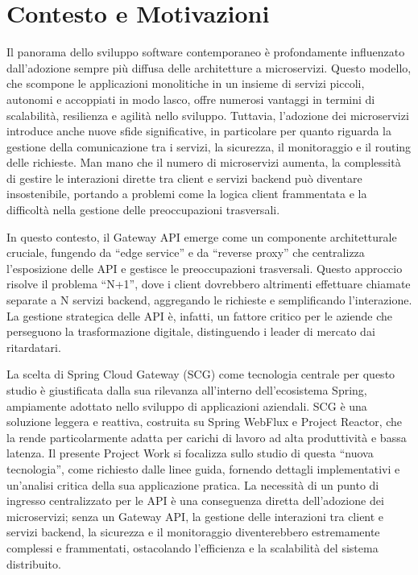 \section{Contesto e Motivazioni}

Il panorama dello sviluppo software contemporaneo è profondamente influenzato dall'adozione sempre più diffusa delle architetture a microservizi. Questo modello, che scompone le applicazioni monolitiche in un insieme di servizi piccoli, autonomi e accoppiati in modo lasco, offre numerosi vantaggi in termini di scalabilità, resilienza e agilità nello sviluppo. Tuttavia, l'adozione dei microservizi introduce anche nuove sfide significative, in particolare per quanto riguarda la gestione della comunicazione tra i servizi, la sicurezza, il monitoraggio e il routing delle richieste. Man mano che il numero di microservizi aumenta, la complessità di gestire le interazioni dirette tra client e servizi backend può diventare insostenibile, portando a problemi come la logica client frammentata e la difficoltà nella gestione delle preoccupazioni trasversali.

In questo contesto, il Gateway API emerge come un componente architetturale cruciale, fungendo da \enquote{edge service} e da \enquote{reverse proxy} che centralizza l'esposizione delle API e gestisce le preoccupazioni trasversali. Questo approccio risolve il problema \enquote{N+1}, dove i client dovrebbero altrimenti effettuare chiamate separate a N servizi backend, aggregando le richieste e semplificando l'interazione. La gestione strategica delle API è, infatti, un fattore critico per le aziende che perseguono la trasformazione digitale, distinguendo i leader di mercato dai ritardatari.

La scelta di Spring Cloud Gateway (SCG) come tecnologia centrale per questo studio è giustificata dalla sua rilevanza all'interno dell'ecosistema Spring, ampiamente adottato nello sviluppo di applicazioni aziendali. SCG è una soluzione leggera e reattiva, costruita su Spring WebFlux e Project Reactor, che la rende particolarmente adatta per carichi di lavoro ad alta produttività e bassa latenza. Il presente Project Work si focalizza sullo studio di questa \enquote{nuova tecnologia}, come richiesto dalle linee guida, fornendo dettagli implementativi e un'analisi critica della sua applicazione pratica. La necessità di un punto di ingresso centralizzato per le API è una conseguenza diretta dell'adozione dei microservizi; senza un Gateway API, la gestione delle interazioni tra client e servizi backend, la sicurezza e il monitoraggio diventerebbero estremamente complessi e frammentati, ostacolando l'efficienza e la scalabilità del sistema distribuito.

